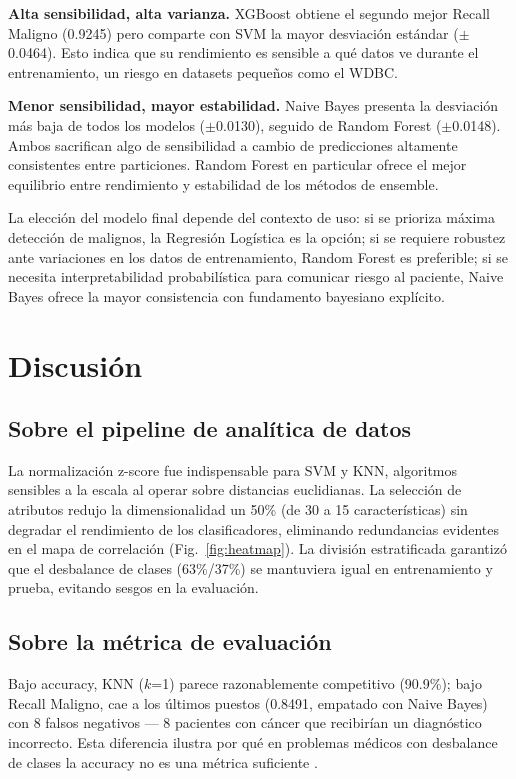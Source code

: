 \documentclass[journal]{IEEEtran}
\begin{document}
\textbf{Alta sensibilidad, alta varianza.} XGBoost obtiene el
segundo mejor Recall Maligno (0.9245) pero comparte con SVM la
mayor desviación estándar ($\pm$0.0464). Esto indica que su
rendimiento es sensible a qué datos ve durante el entrenamiento,
un riesgo en datasets pequeños como el WDBC.

\textbf{Menor sensibilidad, mayor estabilidad.} Naive Bayes
presenta la desviación más baja de todos los modelos
($\pm$0.0130), seguido de Random Forest ($\pm$0.0148). Ambos
sacrifican algo de sensibilidad a cambio de predicciones
altamente consistentes entre particiones. Random Forest en
particular ofrece el mejor equilibrio entre rendimiento y
estabilidad de los métodos de ensemble.

La elección del modelo final depende del contexto
de uso: si se prioriza máxima detección de malignos,
la Regresión Logística es la opción; si se requiere robustez
ante variaciones en los datos de entrenamiento, Random Forest
es preferible; si se necesita interpretabilidad probabilística
para comunicar riesgo al paciente, Naive Bayes ofrece la mayor
consistencia con fundamento bayesiano explícito.
\section{Discusión}

\subsection{Sobre el pipeline de analítica de datos}
La normalización z-score fue indispensable para SVM y KNN,
algoritmos sensibles a la escala al operar sobre distancias
euclidianas. La selección de atributos redujo la dimensionalidad
un 50\% (de 30 a 15 características) sin degradar el rendimiento
de los clasificadores, eliminando redundancias evidentes en el
mapa de correlación (Fig.~\ref{fig:heatmap}). La división
estratificada garantizó que el desbalance de clases (63\%/37\%)
se mantuviera igual en entrenamiento y prueba, evitando sesgos
en la evaluación.

\subsection{Sobre la métrica de evaluación}
Bajo accuracy, KNN ($k$=1) parece razonablemente competitivo
(90.9\%); bajo Recall Maligno, cae a los últimos puestos
(0.8491, empatado con Naive Bayes) con 8 falsos negativos — 8 pacientes con cáncer que
recibirían un diagnóstico incorrecto. Esta diferencia ilustra
por qué en problemas médicos con desbalance de clases la
accuracy no es una métrica suficiente \cite{hossin2015, sokolova2009}.
\end{document}
